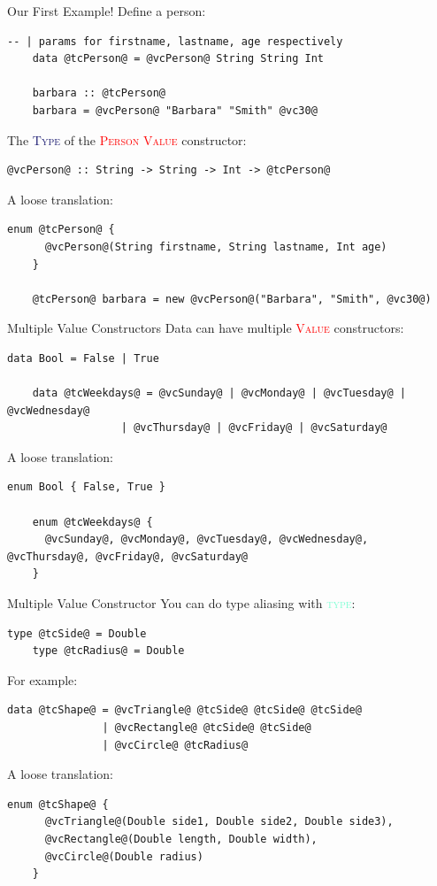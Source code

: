 \documentclass[xcolor={usenames,dvipsnames}]{beamer}
\newcommand{\hkeyword}[1]{\textcolor{Aquamarine}{\textsc{#1}}}
\newcommand{\htycon}[1]{\textcolor{MidnightBlue}{\textsc{#1}}}
\newcommand{\hvalcon}[1]{\textcolor{Red}{\textsc{#1}}}
\begin{document}
\begin{frame}[fragile]{Our First Example!}
  Define a person:
  \begin{lstlisting}[style=hask]
    -- | params for firstname, lastname, age respectively
    data @tcPerson@ = @vcPerson@ String String Int

    barbara :: @tcPerson@
    barbara = @vcPerson@ "Barbara" "Smith" @vc30@
  \end{lstlisting}

  The \htycon{Type} of the \hvalcon{Person Value} constructor:
  \begin{lstlisting}[style=hask]
    @vcPerson@ :: String -> String -> Int -> @tcPerson@
  \end{lstlisting}

  A loose translation:
  \begin{lstlisting}[style=hask]
    enum @tcPerson@ {
      @vcPerson@(String firstname, String lastname, Int age)
    }

    @tcPerson@ barbara = new @vcPerson@("Barbara", "Smith", @vc30@)
  \end{lstlisting}
\end{frame}

\begin{frame}[fragile]{Multiple Value Constructors}
  Data can have multiple \hvalcon{Value} constructors:
  \begin{lstlisting}[style=hask]
    data Bool = False | True

    data @tcWeekdays@ = @vcSunday@ | @vcMonday@ | @vcTuesday@ | @vcWednesday@
                  | @vcThursday@ | @vcFriday@ | @vcSaturday@
  \end{lstlisting}

  A loose translation:
  \begin{lstlisting}[style=hask]
    enum Bool { False, True }

    enum @tcWeekdays@ {
      @vcSunday@, @vcMonday@, @vcTuesday@, @vcWednesday@, @vcThursday@, @vcFriday@, @vcSaturday@
    }
  \end{lstlisting}
\end{frame}

\begin{frame}[fragile]{Multiple Value Constructor}
  You can do type aliasing with \hkeyword{type}:
  \begin{lstlisting}[style=hask]
    type @tcSide@ = Double
    type @tcRadius@ = Double
  \end{lstlisting}

  For example:
  \begin{lstlisting}[style=hask]
    data @tcShape@ = @vcTriangle@ @tcSide@ @tcSide@ @tcSide@
               | @vcRectangle@ @tcSide@ @tcSide@
               | @vcCircle@ @tcRadius@
  \end{lstlisting}

  A loose translation:
  \begin{lstlisting}[style=hask]
    enum @tcShape@ {
      @vcTriangle@(Double side1, Double side2, Double side3),
      @vcRectangle@(Double length, Double width),
      @vcCircle@(Double radius)
    }
  \end{lstlisting}
\end{frame}
\end{document}
